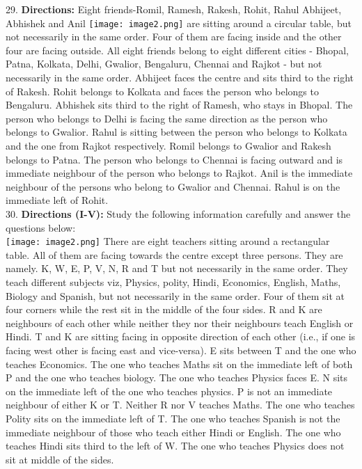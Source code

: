 \documentclass[
]{article}
\begin{document}
29. \textbf{Directions:} Eight friends-Romil, Ramesh, Rakesh, Rohit, Rahul Abhijeet, Abhishek and Anil
\texttt{[image: image2.png]}
are sitting around a circular table, but not necessarily in the same order. Four of them are
facing inside and the other four are facing outside. All eight friends belong to eight different
cities - Bhopal, Patna, Kolkata, Delhi, Gwalior, Bengaluru, Chennai and Rajkot - but not
necessarily in the same order. Abhijeet faces the centre and sits third to the right of Rakesh.
Rohit belongs to Kolkata and faces the person who belongs to Bengaluru. Abhishek sits
third to the right of Ramesh, who stays in Bhopal. The person who belongs to Delhi is facing
the same direction as the person who belongs to Gwalior. Rahul is sitting between the
person who belongs to Kolkata and the one from Rajkot respectively. Romil belongs to
Gwalior and Rakesh belongs to Patna. The person who belongs to Chennai is facing
outward and is immediate neighbour of the person who belongs to Rajkot. Anil is the
immediate neighbour of the persons who belong to Gwalior and Chennai. Rahul is on the
immediate left of Rohit.\\

30. \textbf{Directions (I-V):} Study the following information carefully and answer the questions below:\\
\texttt{[image: image2.png]}
There are eight teachers sitting around a rectangular table. All of them are facing towards
the centre except three persons. They are namely. K, W, E, P, V, N, R and T but not
necessarily in the same order. They teach different subjects viz, Physics, polity, Hindi,
Economics, English, Maths, Biology and Spanish, but not necessarily in the same order. Four
of them sit at four corners while the rest sit in the middle of the four sides. R and K are
neighbours of each other while neither they nor their neighbours teach English or Hindi. T
and K are sitting facing in opposite direction of each other (i.e., if one is facing west other is
facing east and vice-versa). E sits between T and the one who teaches Economics. The one
who teaches Maths sit on the immediate left of both P and the one who teaches biology. The
one who teaches Physics faces E. N sits on the immediate left of the one who teaches
physics. P is not an immediate neighbour of either K or T. Neither R nor V teaches Maths.
The one who teaches Polity sits on the immediate left of T. The one who teaches Spanish is
not the immediate neighbour of those who teach either Hindi or English. The one who
teaches Hindi sits third to the left of W. The one who teaches Physics does not sit at middle
of the sides.\\
\end{document}
